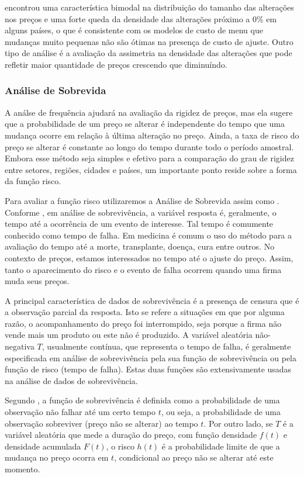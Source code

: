 \begin{algorithm}[H]
\citet{cavallo2010scraped} encontrou uma característica bimodal na distribuição do tamanho das alterações nos preços e uma forte queda da densidade das alterações próximo a 0\% em alguns países, o que é consistente com os modelos de custo de menu que mudanças muito pequenas não são ótimas na presença de custo de ajuste. Outro tipo de análise é a avaliação da assimetria na densidade das alterações que pode refletir maior quantidade de preços crescendo que diminuíndo. 
 
\subsubsection*{Análise de Sobrevida}

A análse de frequência ajudará na avaliação da rigidez de preços, mas ela sugere que a probabilidade de um preço se alterar é independente do tempo que uma mudança ocorre em relação à última alteração no preço. Ainda, a taxa de risco do preço se alterar é constante ao longo do tempo durante todo o período amostral. Embora esse método seja simples e efetivo para a comparação do grau de rigidez entre setores, regiões, cidades e países, um importante ponto reside sobre a forma da função risco. 

Para avaliar a função risco utilizaremos a Análise de Sobrevida assim como \citet{cavallo2010scraped}. Conforme \citet{colosimo2006analise}, em análise de sobrevivência, a variável resposta é, geralmente, o tempo até a ocorrência de um evento de interesse. Tal tempo é comumente conhecido como tempo de falha. Em medicina é comum o uso do método para a avaliação do tempo até a morte, transplante, doença, cura  entre outros. No contexto de preços, estamos interessados no tempo até o ajuste do preço. Assim, tanto o aparecimento do risco e o evento de falha ocorrem quando uma firma muda seus preços.  

A principal característica de dados de sobrevivência é a presença de censura que é a observação parcial da resposta. Isto se refere a situações em que por alguma razão, o acompanhamento do preço foi interrompido, seja porque a firma não vende mais um produto ou este não é produzido. A variável aleatória não-negativa $T$, usualmente contínua, que representa o tempo de falha, é geralmente especificada em análise de sobrevivência pela sua função de sobrevivência ou pela função de risco (tempo de falha). Estas duas funções são extensivamente usadas na análise de dados de sobrevivência. 

Segundo \citet{colosimo2006analise}, a função de sobrevivência é definida como a probabilidade de uma observação não falhar até um certo tempo $t$, ou seja, a probabilidade de uma observação sobreviver (preço não se alterar) ao tempo $t$. Por outro lado, se $T$ é a variável aleatória que mede a duração do preço, com função densidade $f\left(t\right)$ e densidade acumulada $F\left(t\right)$, o risco $h\left(t\right)$ é a probabilidade limite de que a mudança no preço ocorra em $t$, condicional ao preço não se alterar até este momento. 


\end{algorithm}
